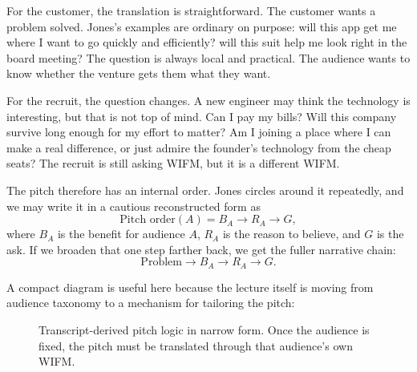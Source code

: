 For the customer, the translation is straightforward. The customer wants a problem solved. Jones's examples are ordinary on purpose: will this app get me where I want to go quickly and efficiently? will this suit help me look right in the board meeting? The question is always local and practical. The audience wants to know whether the venture gets them what they want.

For the recruit, the question changes. A new engineer may think the technology is interesting, but that is not top of mind. Can I pay my bills? Will this company survive long enough for my effort to matter? Am I joining a place where I can make a real difference, or just admire the founder's technology from the cheap seats? The recruit is still asking WIFM, but it is a different WIFM.

The pitch therefore has an internal order. Jones circles around it repeatedly, and we may write it in a cautious reconstructed form as
\begin{equation}
\text{Pitch order}(A)=B_A \to R_A \to G,
\end{equation}
where \(B_A\) is the benefit for audience \(A\), \(R_A\) is the reason to believe, and \(G\) is the ask. If we broaden that one step farther back, we get the fuller narrative chain:
\begin{equation}
\text{Problem} \to B_A \to R_A \to G.
\end{equation}

A compact diagram is useful here because the lecture itself is moving from audience taxonomy to a mechanism for tailoring the pitch:

\begin{figure}[h]
\centering
{}
\caption{Transcript-derived pitch logic in narrow form. Once the audience is fixed, the pitch must be translated through that audience's own WIFM.}
\end{figure}

